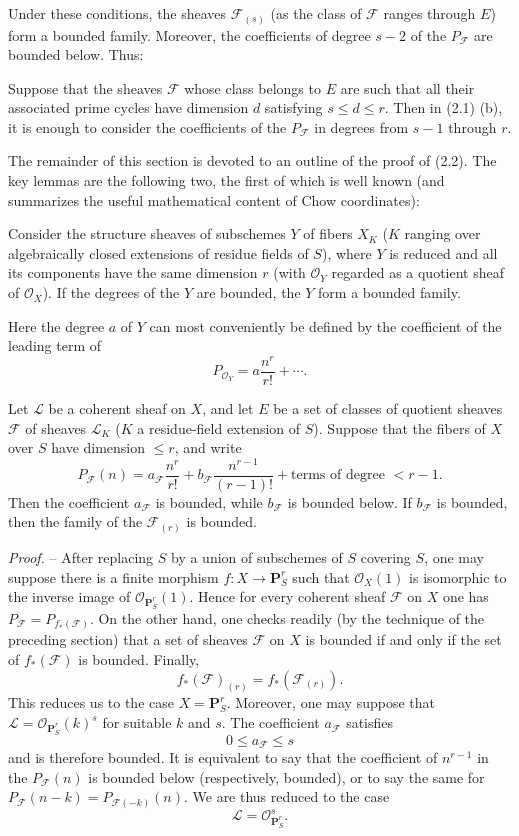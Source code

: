 Under these conditions, the sheaves $\mathcal F_{(s)}$ (as the class of
$\mathcal F$ ranges through $E$) form a bounded family. Moreover, the
coefficients of degree $s-2$ of the $P_{\mathcal F}$ are bounded below.
Thus:

 Suppose that the sheaves $\mathcal F$ whose class
belongs to $E$ are such that all their associated prime cycles have dimension
$d$ satisfying $s\leq d\leq r$. Then in (2.1) (b), it is enough to consider
the coefficients of the $P_{\mathcal F}$ in degrees from $s-1$ through $r$.

The remainder of this section is devoted to an outline of the proof of (2.2).
The key lemmas are the following two, the first of which is well known (and
summarizes the useful mathematical content of Chow coordinates):

 Consider the structure sheaves of subschemes $Y$ of
fibers $X_K$ ($K$ ranging over algebraically closed extensions of residue
fields of $S$), where $Y$ is reduced and all its components have the same
dimension $r$ (with $\mathcal O_Y$ regarded as a quotient sheaf of
$\mathcal O_X$). If the degrees of the $Y$ are bounded, the $Y$ form a bounded
family.

Here the degree $a$ of $Y$ can most conveniently be defined by the coefficient
of the leading term of
\[
P_{\mathcal O_Y}=a\frac{n^r}{r!}+\cdots.
\]

 Let $\mathcal L$ be a coherent sheaf on $X$, and let $E$
be a set of classes of quotient sheaves $\mathcal F$ of sheaves $\mathcal L_K$
($K$ a residue-field extension of $S$). Suppose that the fibers of $X$ over
$S$ have dimension $\leq r$, and write
\[
P_{\mathcal F}(n)=a_{\mathcal F}\frac{n^r}{r!}
+b_{\mathcal F}\frac{n^{r-1}}{(r-1)!}
+\text{terms of degree $<r-1$}.
\]
Then the coefficient $a_{\mathcal F}$ is bounded, while $b_{\mathcal F}$ is
bounded below. If $b_{\mathcal F}$ is bounded, then the family of the
$\mathcal F_{(r)}$ is bounded.

\emph{Proof.} -- After replacing $S$ by a union of subschemes of $S$ covering
$S$, one may suppose there is a finite morphism
$f:X\longrightarrow\mathbf P^r_S$ such that $\mathcal O_X(1)$ is isomorphic to
the inverse image of $\mathcal O_{\mathbf P^r_S}(1)$. Hence for every coherent
sheaf $\mathcal F$ on $X$ one has
$P_{\mathcal F}=P_{f_*(\mathcal F)}$. On the other hand, one checks readily
(by the technique of the preceding section) that a set of sheaves $\mathcal F$
on $X$ is bounded if and only if the set of $f_*(\mathcal F)$ is bounded.
Finally,
\[
f_*(\mathcal F)_{(r)}=f_*(\mathcal F_{(r)}).
\]
This reduces us to the case $X=\mathbf P^r_S$. Moreover, one may suppose that
$\mathcal L=\mathcal O_{\mathbf P^r_S}(k)^s$ for suitable $k$ and $s$. The
coefficient $a_{\mathcal F}$ satisfies
\[
0\leq a_{\mathcal F}\leq s
\]
and is therefore bounded. It is equivalent to say that the coefficient of
$n^{r-1}$ in the $P_{\mathcal F}(n)$ is bounded below (respectively, bounded),
or to say the same for
$P_{\mathcal F}(n-k)=P_{\mathcal F(-k)}(n)$. We are thus reduced to the case
\[
\mathcal L=\mathcal O_{\mathbf P^r_S}^{s}.
\]

